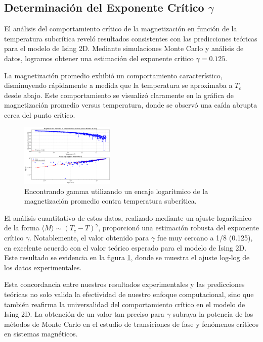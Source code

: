 \documentclass[twocolumn]{article}
\begin{document}
\subsection*{Determinación del Exponente Crítico $\gamma$}

El análisis del comportamiento crítico de la magnetización en función de la temperatura subcrítica reveló resultados consistentes con las predicciones teóricas para el modelo de Ising 2D. Mediante  simulaciones Monte Carlo y análisis de datos, logramos obtener una estimación del exponente crítico $\gamma = 0.125$.

La magnetización promedio exhibió un comportamiento característico, disminuyendo rápidamente a medida que la temperatura se aproximaba a $T_c$ desde abajo. Este comportamiento se visualizó claramente en la gráfica de magnetización promedio versus temperatura, donde se observó una caída abrupta cerca del punto crítico.

\begin{figure}[hbt]
    \centering
    \includegraphics[width=0.4\textwidth]{figures/gamma.png}
    \caption{Encontrando gamma utilizando un encaje logarítmico de la magnetización promedio contra temperatura subcrítica.}
    \label{fig:gamma}
\end{figure}

El análisis cuantitativo de estos datos, realizado mediante un ajuste logarítmico de la forma $\langle M \rangle \sim (T_c - T)^\gamma$, proporcionó una estimación robusta del exponente crítico $\gamma$. Notablemente, el valor obtenido para $\gamma$ fue muy cercano a 1/8 (0.125), en excelente acuerdo con el valor teórico esperado para el modelo de Ising 2D. Este resultado se evidencia en la figura \ref{fig:gamma}, donde se muestra el ajuste log-log de los datos experimentales.


Esta concordancia entre nuestros resultados experimentales y las predicciones teóricas no solo valida la efectividad de nuestro enfoque computacional, sino que también reafirma la universalidad del comportamiento crítico en el modelo de Ising 2D. La obtención de un valor tan preciso para $\gamma$ subraya la potencia de los métodos de Monte Carlo en el estudio de transiciones de fase y fenómenos críticos en sistemas magnéticos.
\end{document}
